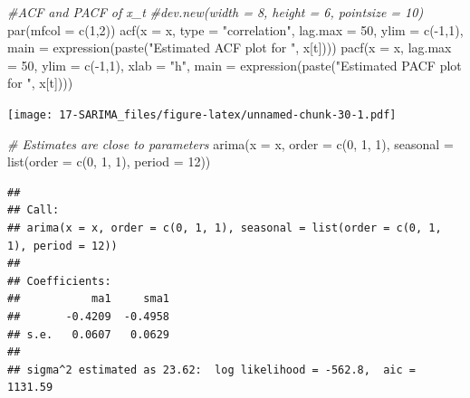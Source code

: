 \documentclass[
]{book}
\newenvironment{Shaded}{\begin{snugshade}}{\end{snugshade}}
\newcommand{\AttributeTok}[1]{\textcolor[rgb]{0.77,0.63,0.00}{#1}}
\newcommand{\CommentTok}[1]{\textcolor[rgb]{0.56,0.35,0.01}{\textit{#1}}}
\newcommand{\DecValTok}[1]{\textcolor[rgb]{0.00,0.00,0.81}{#1}}
\newcommand{\FunctionTok}[1]{\textcolor[rgb]{0.00,0.00,0.00}{#1}}
\newcommand{\NormalTok}[1]{#1}
\newcommand{\SpecialCharTok}[1]{\textcolor[rgb]{0.00,0.00,0.00}{#1}}
\newcommand{\StringTok}[1]{\textcolor[rgb]{0.31,0.60,0.02}{#1}}
\theoremstyle{definition}
\theoremstyle{definition}
\theoremstyle{definition}
\theoremstyle{definition}
\theoremstyle{remark}
\begin{document}
\begin{Shaded}
\begin{Highlighting}[]
\CommentTok{\#ACF and PACF of x\_t}
  \CommentTok{\#dev.new(width = 8, height = 6, pointsize = 10)}
\FunctionTok{par}\NormalTok{(}\AttributeTok{mfcol =} \FunctionTok{c}\NormalTok{(}\DecValTok{1}\NormalTok{,}\DecValTok{2}\NormalTok{))}
  \FunctionTok{acf}\NormalTok{(}\AttributeTok{x =}\NormalTok{ x, }\AttributeTok{type =} \StringTok{"correlation"}\NormalTok{, }\AttributeTok{lag.max =} \DecValTok{50}\NormalTok{, }\AttributeTok{ylim =} \FunctionTok{c}\NormalTok{(}\SpecialCharTok{{-}}\DecValTok{1}\NormalTok{,}\DecValTok{1}\NormalTok{), }\AttributeTok{main =} \FunctionTok{expression}\NormalTok{(}\FunctionTok{paste}\NormalTok{(}\StringTok{"Estimated ACF plot for "}\NormalTok{, x[t])))}
  \FunctionTok{pacf}\NormalTok{(}\AttributeTok{x =}\NormalTok{ x, }\AttributeTok{lag.max =} \DecValTok{50}\NormalTok{, }\AttributeTok{ylim =} \FunctionTok{c}\NormalTok{(}\SpecialCharTok{{-}}\DecValTok{1}\NormalTok{,}\DecValTok{1}\NormalTok{), }\AttributeTok{xlab =} \StringTok{"h"}\NormalTok{, }\AttributeTok{main =} \FunctionTok{expression}\NormalTok{(}\FunctionTok{paste}\NormalTok{(}\StringTok{"Estimated PACF plot for "}\NormalTok{, x[t])))}
\end{Highlighting}
\end{Shaded}

\texttt{[image: 17-SARIMA\_files/figure-latex/unnamed-chunk-30-1.pdf]}

\begin{Shaded}
\begin{Highlighting}[]
 \CommentTok{\# Estimates are close to parameters}
  \FunctionTok{arima}\NormalTok{(}\AttributeTok{x =}\NormalTok{ x, }\AttributeTok{order =} \FunctionTok{c}\NormalTok{(}\DecValTok{0}\NormalTok{, }\DecValTok{1}\NormalTok{, }\DecValTok{1}\NormalTok{), }\AttributeTok{seasonal =} \FunctionTok{list}\NormalTok{(}\AttributeTok{order =} \FunctionTok{c}\NormalTok{(}\DecValTok{0}\NormalTok{, }\DecValTok{1}\NormalTok{, }\DecValTok{1}\NormalTok{), }\AttributeTok{period =} \DecValTok{12}\NormalTok{))}
\end{Highlighting}
\end{Shaded}

\begin{verbatim}
## 
## Call:
## arima(x = x, order = c(0, 1, 1), seasonal = list(order = c(0, 1, 1), period = 12))
## 
## Coefficients:
##           ma1     sma1
##       -0.4209  -0.4958
## s.e.   0.0607   0.0629
## 
## sigma^2 estimated as 23.62:  log likelihood = -562.8,  aic = 1131.59
\end{verbatim}
\end{document}
